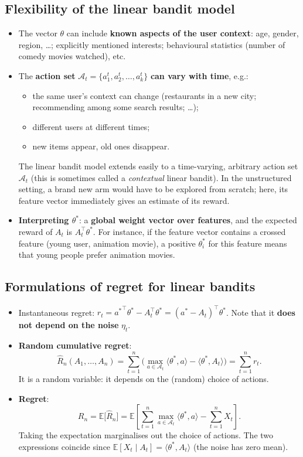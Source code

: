 \subsection{Flexibility of the linear bandit model}

\begin{itemize}
    \item The vector $\theta$ can include \textbf{known aspects of the user context}: age, gender, region, \dots; explicitly mentioned interests; behavioural statistics (number of comedy movies watched), etc.
    \item The \textbf{action set} $\mathcal{A}_t = \{a_1^t, a_2^t, \dots, a_k^t\}$ \textbf{can vary with time}, e.g.:
    \begin{itemize}
        \item the same user's context can change (restaurants in a new city; recommending among some search results; \dots);
        \item different users at different times;
        \item new items appear, old ones disappear.
    \end{itemize}
    The linear bandit model extends easily to a time-varying, arbitrary action set $\mathcal{A}_t$ (this is sometimes called a \emph{contextual} linear bandit). In the unstructured setting, a brand new arm would have to be explored from scratch; here, its feature vector immediately gives an estimate of its reward.
    \item \textbf{Interpreting $\theta^*$}: a \textbf{global weight vector over features}, and the expected reward of $A_t$ is $A_t^\top\theta^*$. For instance, if the feature vector contains a crossed feature (young user, animation movie), a positive $\theta_i^*$ for this feature means that young people prefer animation movies.
\end{itemize}

\subsection{Formulations of regret for linear bandits}

\begin{itemize}
    \item Instantaneous regret: $r_t = {a^*}^\top\theta^* - A_t^\top\theta^* = (a^* - A_t)^\top\theta^*$. Note that it \textbf{does not depend on the noise} $\eta_t$.
    \item \textbf{Random cumulative regret}:
    \[
    \hat{R}_n(A_1, \dots, A_n) = \sum_{t=1}^n \Big( \max_{a\in\mathcal{A}_t} \langle\theta^*, a\rangle - \langle\theta^*, A_t\rangle \Big) = \sum_{t=1}^n r_t.
    \]
    It is a random variable: it depends on the (random) choice of actions.
    \item \textbf{Regret}:
    \[
    R_n = \mathbb{E}\big[\hat{R}_n\big] = \mathbb{E}\left[\sum_{t=1}^n \max_{a\in\mathcal{A}_t}\langle\theta^*, a\rangle - \sum_{t=1}^n X_t\right].
    \]
    Taking the expectation marginalises out the choice of actions. The two expressions coincide since $\mathbb{E}[X_t \mid A_t] = \langle\theta^*, A_t\rangle$ (the noise has zero mean).
\end{itemize}

